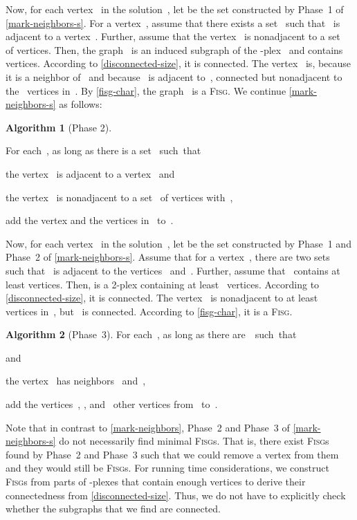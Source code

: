 \documentclass[12pt, a4paper, abstracton]{scrreprt}
\newcommand{\pl}[1]{\mbox{-plex}}
\newcommand{\FISG}{\textsc{Fisg}}
\newcounter{theorem}
\theoremstyle{definition}
\newtheorem{proc}{Algorithm}[chapter]
\theoremstyle{remark}
\begin{document}
\noindent Now, for each vertex~ in the solution~, let  be
the set constructed by Phase~1 of \autoref{mark-neighbors-s}. For a
vertex~, assume that there exists a set~ such
that~ is adjacent to a vertex~. Further,
assume that the vertex~ is nonadjacent to a set~ of  vertices. Then, the graph~
is an induced subgraph of the \pl s~ and contains 
vertices. According to \autoref{disconnected-size}, it is
connected. The vertex~ is, because it is a neighbor of~ and because~ is adjacent to~, connected but nonadjacent to
the~ vertices in~. By \autoref{fisg-char}, the
graph~ is a \FISG{}. We continue
\autoref{mark-neighbors-s} as follows:
 
\begin{proc}[Phase 2]
  \begin{samepage}
    For each~, as long as there is a set~ such~that
    \begin{compactenum}
    \item the vertex~ is adjacent to a vertex~ and
    \item the vertex~ is nonadjacent to a set~ of vertices with~,
    \end{compactenum}
    add the vertex  and the vertices in~ to~.
  \end{samepage}
\end{proc}\setcounter{proc}{0}

\noindent Now, for each vertex~ in the solution~, let  be
the set constructed by Phase~1 and Phase~2 of
\autoref{mark-neighbors-s}. Assume that for a vertex~, there
are two sets~ such that~ is adjacent to the
vertices~ and~. Further,
assume that~ contains at least  vertices. Then,
 is a 2-plex containing at least~
vertices. According to \autoref{disconnected-size}, it is
connected. The vertex~ is nonadjacent to
at least~ vertices in~, but~ is
connected. According to \autoref{fisg-char}, it is a \FISG{}.
 
\begin{proc}[Phase~3]
  For each~, as long as there are~~such~that
  \begin{compactenum}
  \item  and
  \item the vertex~ has neighbors~ and~,
  \end{compactenum}
add the vertices~, ,
  and~ other vertices from~ to~.
\end{proc}
 
\noindent Note that in contrast to \autoref{mark-neighbors}, Phase~2 and Phase~3 of \autoref{mark-neighbors-s} do not necessarily find minimal \FISG{}s. That is, there exist \FISG{}s found by Phase~2 and Phase~3 such that we could remove a vertex from them and they would still be \FISG{}s. For running time considerations, we construct \FISG{}s from parts of \pl{s}es that contain enough vertices to derive their connectedness from \autoref{disconnected-size}. Thus, we do not have to explicitly check whether the subgraphs that we find are connected.
 
\end{document}
